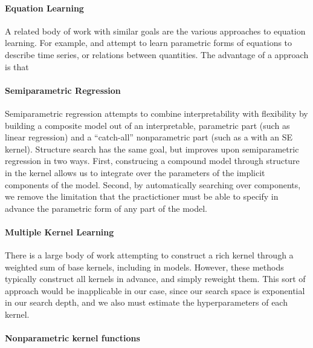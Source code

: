 \documentclass[twoside]{article}
\begin{document}
\paragraph{Equation Learning}
A related body of work with similar goals are the various approaches to equation learning.  
For example, \cite{dzeroski1999equation} and \cite{washio1999discovering} attempt to learn parametric forms of equations to describe time series, or relations between quantities.  The advantage of a \gp{} approach is that 

\paragraph{Semiparametric Regression}
Semiparametric regression  attempts to combine interpretability with flexibility by building  a composite model out of an interpretable, parametric part (such as linear regression) and a ``catch-all'' nonparametric part (such as a \gp{} with an SE kernel).
Structure search has the same goal, but improves upon semiparametric regression in two ways.
First, construcing a compound model through structure in the kernel allows us to integrate over the parameters of the implicit components of the model.
Second, by automatically searching over components, we remove the limitation that the practictioner must be able to specify in advance the parametric form of any part of the model.


\paragraph{Multiple Kernel Learning}
There is a large body of work attempting to construct a rich kernel through a weighted sum of base kernels, including in \gp{} models.  
\cite{christoudias2009bayesian}
However, these methods typically construct all kernels in advance, and simply reweight them.  This sort of approach would be inapplicable in our case, since our search space is exponential in our search depth, and we also must estimate the hyperparameters of each kernel.%

\paragraph{Nonparametric kernel functions}
\end{document}
